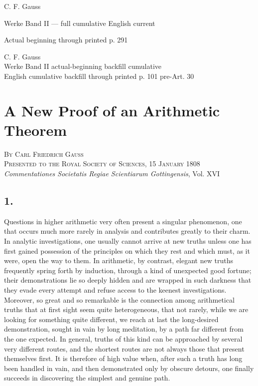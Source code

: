 \documentclass[12pt]{article}
\begin{document}
\begin{center}
{\Large C. F. Gauss}\par
{\large Werke Band II — full cumulative English current}\par
{\large Actual beginning through printed p. 291}
\end{center}



\begin{center}
{\Large C. F. Gauss}\\[3pt]
{\large Werke Band II actual-beginning backfill cumulative}\\[3pt]
{\large English cumulative backfill through printed p. 101 pre-Art. 30}
\end{center}


\section*{A New Proof of an Arithmetic Theorem}

\begin{center}
\textsc{By Carl Friedrich Gauss}\\
\textsc{Presented to the Royal Society of Sciences, 15 January 1808}\\[3pt]
\emph{Commentationes Societatis Regiae Scientiarum Gottingensis}, Vol. XVI
\end{center}

\subsection*{1.}

Questions in higher arithmetic very often present a singular phenomenon, one that occurs much more rarely in analysis and contributes greatly to their charm. In analytic investigations, one usually cannot arrive at new truths unless one has first gained possession of the principles on which they rest and which must, as it were, open the way to them. In arithmetic, by contrast, elegant new truths frequently spring forth by induction, through a kind of unexpected good fortune; their demonstrations lie so deeply hidden and are wrapped in such darkness that they evade every attempt and refuse access to the keenest investigations. Moreover, so great and so remarkable is the connection among arithmetical truths that at first sight seem quite heterogeneous, that not rarely, while we are looking for something quite different, we reach at last the long-desired demonstration, sought in vain by long meditation, by a path far different from the one expected. In general, truths of this kind can be approached by several very different routes, and the shortest routes are not always those that present themselves first. It is therefore of high value when, after such a truth has long been handled in vain, and then demonstrated only by obscure detours, one finally succeeds in discovering the simplest and genuine path.
\end{document}
